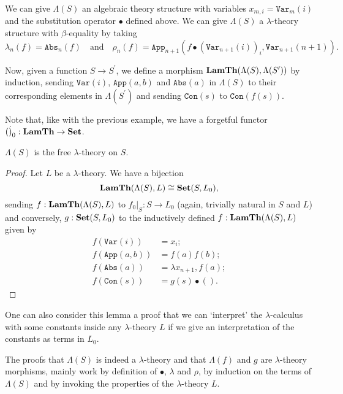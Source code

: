 \begin{example}\label{ex:free-lambda-theory}
  We can give $ \Lambda(S) $ an algebraic theory structure with variables $ x_{m, i} = \mathtt{Var}_m(i) $ and the substitution operator $ \bullet $ defined above. We can give $ \Lambda(S) $ a $ \lambda $-theory structure with $ \beta $-equality by taking
  \[ \lambda_n(f) = \mathtt{Abs}_n(f) \quad \text{and} \quad \rho_n(f) = \mathtt{App}_{n + 1}(f \bullet (\mathtt{Var}_{n + 1}(i))_i, \mathtt{Var}_{n + 1}(n + 1)). \]

  Now, given a function $ S \to S^\prime $, we define a morphism $ \mathbf{LamTh}(\Lambda(S), \Lambda(S^\prime)) $ by induction, sending $ \mathtt{Var}(i) $, $ \mathtt{App}(a, b) $ and $ \mathtt{Abs}(a) $ in $ \Lambda(S) $ to their corresponding elements in $ \Lambda(S^\prime) $ and sending $ \mathtt{Con}(s) $ to $ \mathtt{Con}(f(s)) $.
\end{example}

Note that, like with the previous example, we have a forgetful functor $ (\dot)_0: \mathbf{LamTh} \to \mathbf{Set} $.

\begin{lemma}
  $ \Lambda(S) $ is the free $ \lambda $-theory on $ S $.
\end{lemma}
\begin{proof}
  Let $ L $ be a $ \lambda $-theory. We have a bijection
  \[ \mathbf{LamTh}(\Lambda(S), L) \cong \mathbf{Set}(S, L_0), \]
  sending $ f: \mathbf{LamTh}(\Lambda(S), L) $ to $ f_0 \vert_S: S \to L_0 $ (again, trivially natural in $ S $ and $ L $) and conversely, $ g: \mathbf{Set}(S, L_0) $ to the inductively defined $ f: \mathbf{LamTh}(\Lambda(S), L) $ given by
  \begin{align*}
    f(\mathtt{Var}(i)) &= x_i;\\
    f(\mathtt{App}(a, b)) &= f(a) f(b);\\
    f(\mathtt{Abs}(a)) &= \lambda x_{n + 1}, f(a);\\
    f(\mathtt{Con}(s)) &= g(s) \bullet ().
  \end{align*}
\end{proof}

\begin{remark}
  One can also consider this lemma a proof that we can `interpret' the $ \lambda $-calculus with some constants inside any $ \lambda $-theory $ L $ if we give an interpretation of the constants as terms in $ L_0 $.
\end{remark}

The proofs that $ \Lambda(S) $ is indeed a $ \lambda $-theory and that $ \Lambda(f) $ and $ g $ are $ \lambda $-theory morphisms, mainly work by definition of $ \bullet $, $ \lambda $ and $ \rho $, by induction on the terms of $ \Lambda(S) $ and by invoking the properties of the $ \lambda $-theory $ L $.


